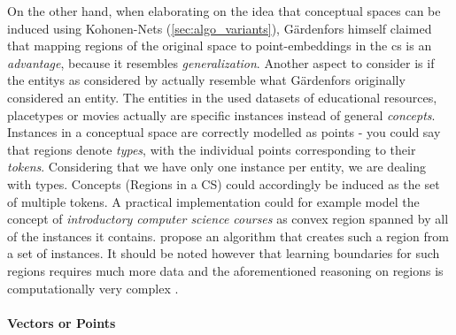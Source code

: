 On the other hand, when elaborating on the idea that conceptual spaces can be induced using Kohonen-Nets (\autoref{sec:algo_variants}), Gärdenfors himself claimed that mapping regions of the original space to point-embeddings in the \gls{cs} is an \textit{advantage}, because it resembles \textit{generalization}. Another aspect to consider is if the \glspl{entity} as considered by \mainalgos actually resemble what Gärdenfors originally considered an entity. The entities in the used datasets of educational resources, placetypes or movies actually are specific instances instead of general \textit{concepts}. Instances in a conceptual space are correctly modelled as points - you could say that regions denote \textit{types}, with the individual points corresponding to their \textit{tokens}. Considering that we have only one instance per entity, we are dealing with types. Concepts (Regions in a CS) could accordingly be induced as the set of multiple tokens. A practical implementation could for example model the concept of \textit{introductory computer science courses} as convex region spanned by all of the instances it contains. \cite{Erk2009} propose an algorithm that creates such a region from a set of instances. It should be noted however that learning boundaries for such regions requires much more data \cite{Derrac2015} and the aforementioned reasoning on regions is computationally very complex \cite{Hernandez-Conde2017}.


\paragraph{Vectors or Points}

